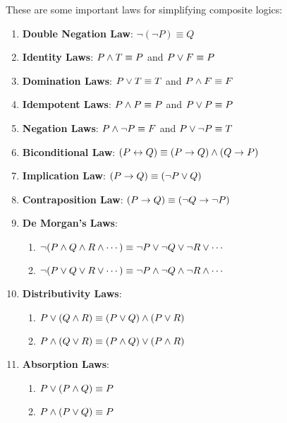 \begin{theorem}
    These are some important laws for simplifying composite logics:
    \begin{enumerate}
        \item \textbf{Double Negation Law}: $\neg(\neg P) \equiv Q$
        \item \textbf{Identity Laws}: $P \wedge T \equiv P$ and $P \vee F \equiv P$
        \item \textbf{Domination Laws}: $P \vee T \equiv T$ and $P \wedge F \equiv F$
        \item \textbf{Idempotent Laws}: $P \wedge P \equiv P$ and $P \vee P \equiv P$
        \item \textbf{Negation Laws}: $P \wedge \neg P \equiv F$ and $P \vee \neg P \equiv T$
        \item \textbf{Biconditional Law}: $(P \leftrightarrow Q) \equiv (P \rightarrow Q) \wedge (Q \rightarrow P)$
        \item \textbf{Implication Law}: $(P \rightarrow Q) \equiv (\neg P \vee Q)$
        \item \textbf{Contraposition Law}: $(P \rightarrow Q) \equiv (\neg Q \rightarrow \neg P)$
        \item \textbf{De Morgan's Laws}:
        \begin{enumerate}
            \item $\neg(P \wedge Q \wedge R \wedge \cdots) \equiv \neg P \vee \neg Q \vee \neg R \vee \cdots$
            \item $\neg(P \vee Q \vee R \vee \cdots) \equiv \neg P \wedge \neg Q \wedge \neg R \wedge \cdots$
        \end{enumerate}
        \item \textbf{Distributivity Laws}:
        \begin{enumerate}
            \item $P \vee (Q \wedge R) \equiv (P \vee Q) \wedge (P \vee R)$
            \item $P \wedge (Q \vee R) \equiv (P \wedge Q) \vee (P \wedge R)$
        \end{enumerate}
        \item \textbf{Absorption Laws}:
        \begin{enumerate}
            \item $P \vee (P \wedge Q) \equiv P$
            \item $P \wedge (P \vee Q) \equiv P$
        \end{enumerate}
    \end{enumerate}
\end{theorem}

